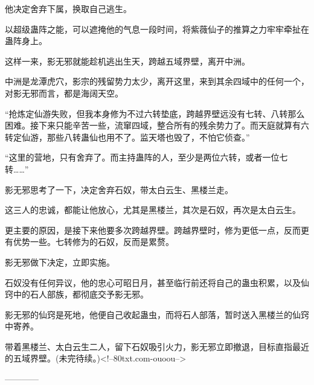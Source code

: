 \begin{this_body}
他决定舍弃下属，换取自己逃生。

以超级蛊阵之能，可以遮掩他的气息一段时间，将紫薇仙子的推算之力牢牢牵扯在蛊阵身上。

这样一来，影无邪就能趁机逃出生天，跨越五域界壁，离开中洲。

中洲是龙潭虎穴，影宗的残留势力太少，离开这里，来到其余四域中的任何一个，对影无邪而言，都是海阔天空。

“抢炼定仙游失败，但我本身修为不过六转垫底，跨越界壁远没有七转、八转那么困难。接下来只能辛苦一些，流窜四域，整合所有的残余势力了。而天庭就算有六转定仙游，那些八转蛊仙也用不了。监天塔也毁了，不怕它侦查。”

“这里的营地，只有舍弃了。而主持蛊阵的人，至少是两位六转，或者一位七转……”

影无邪思考了一下，决定舍弃石奴，带太白云生、黑楼兰走。

这三人的忠诚，都能让他放心，尤其是黑楼兰，其次是石奴，再次是太白云生。

更主要的原因，是接下来他要多次跨越界壁。跨越界壁时，修为更低一点，反而更有优势一些。七转修为的石奴，反而是累赘。

影无邪做下决定，立即实施。

石奴没有任何异议，他的忠心可昭日月，甚至临行前还将自己的蛊虫积累，以及仙窍中的石人部族，都彻底交予影无邪。

影无邪的仙窍是死地，他便自己收起蛊虫，而将石人部落，暂时送入黑楼兰的仙窍中寄养。

带着黑楼兰、太白云生二人，留下石奴吸引火力，影无邪立即撤退，目标直指最近的五域界壁。(未完待续。)<!--80txt.com-ouoou-->

------------

\end{this_body}

